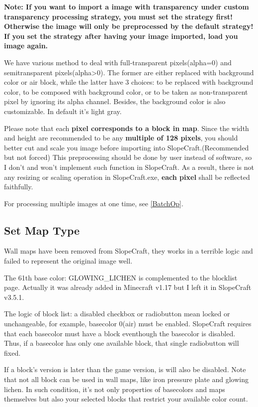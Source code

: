 \documentclass{article}
\begin{document}
\textbf{Note: If you want to import a image with transparency under custom transparency processing strategy, you must set the strategy first! Otherwise the image will only be preprocessed by the default strategy! If you set the strategy after having your image imported, load you image again.}

We have various method to deal with full-transparent pixels(alpha=0) and semitransparent pixels(alpha>0). The former are either replaced with background color or air block, while the latter have 3 choices: to be replaced with background color, to be composed with background color, or to be taken as non-transparent pixel by ignoring its alpha channel. Besides, the background color is also customizable. In default it's light gray.

Please note that each \textbf{pixel corresponds to a block in map}. Since the width and height are recommended to be any \textbf{multiple of 128 pixels}, you should better cut and scale you image before importing into SlopeCraft.(Recommended but not forced) This preprocessing should be done by user instead of software, so I don't and won't implement such function in SlopeCraft. As a result, there is not any resizing or scaling operation in SlopeCraft.exe, \textbf{each pixel} shall be reflected faithfully.

For processing multiple images at one time, see \ref{BatchOp}.

\subsection{Set Map Type}
Wall maps have been removed from SlopeCraft, they works in a terrible logic and failed to represent the original image well.

The 61th base color: GLOWING\_LICHEN is complemented to the blocklist page. Actually it was already added in Minecraft v1.17 but I left it in SlopeCraft v3.5.1.

The logic of block list: a disabled checkbox or radiobutton mean locked or unchangeable, for example, basecolor 0(air) must be enabled. SlopeCraft requires that each basecolor must have a block eventhough the basecolor is disabled. Thus, if a basecolor has only one available block, that single radiobutton will fixed.

If a block's version is later than the game version, is will also be disabled. Note that not all block can be used in wall maps, like iron pressure plate and glowing lichen. In such condition, it's not only properties of basecolors and maps themselves but also your selected blocks that restrict your available color count.
\end{document}

